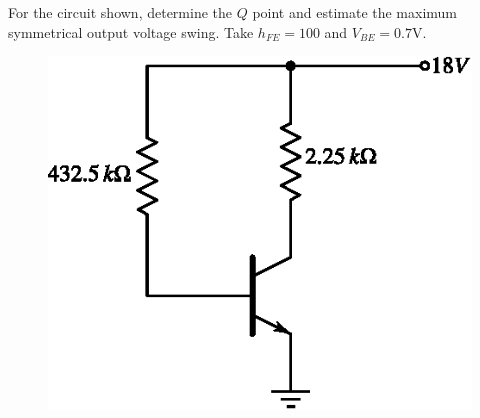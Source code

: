 \smallskip

\begin{example}\label{exam4.9}
For the circuit shown, determine the $Q$ point and estimate the maximum symmetrical output voltage swing. Take $h_{FE}=100$ and $V_{BE}=0.7\text{V}$.
\begin{figure}[H]
\centering
\includegraphics{chap3/exp3.9.eps}
\end{figure}
\end{example}

\eject

